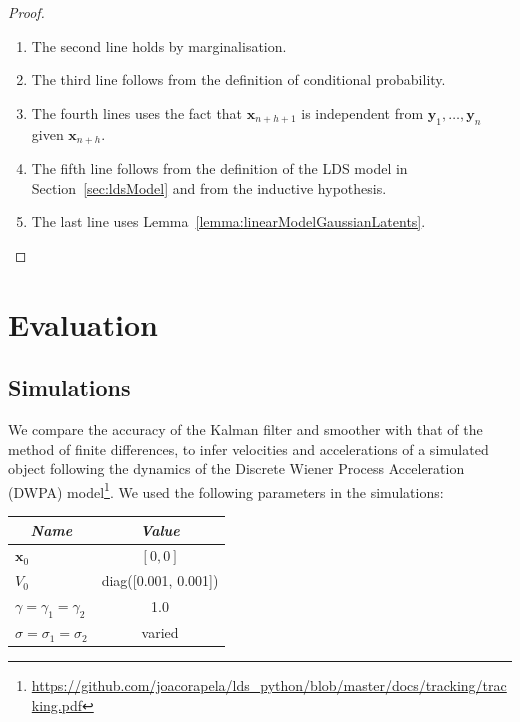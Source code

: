 \documentclass[12pt]{article}
\begin{document}
\begin{proof}
\begin{description}
\begin{enumerate}
                \item The second line holds by marginalisation.

                \item The third line follows from the definition of conditional
                    probability.

                \item The fourth lines uses the fact
                    that $\mathbf{x}_{n+h+1}$ is independent from
                    $\mathbf{y}_1,\ldots,\mathbf{y}_{n}$ given
                    $\mathbf{x}_{n+h}$.

                \item The fifth line follows from the definition of the LDS
                    model in Section~\ref{sec:ldsModel} and from the inductive
                    hypothesis.

                \item The last line uses
                    Lemma~\ref{lemma:linearModelGaussianLatents}.

            \end{enumerate}

    \end{description}

\end{proof}

\section{Evaluation}

\subsection{Simulations}

We compare the accuracy of the Kalman filter and smoother with that of the
method of finite differences, to infer velocities and accelerations of a
simulated object following the dynamics of the Discrete Wiener Process
Acceleration (DWPA)
model\footnote{\url{https://github.com/joacorapela/lds_python/blob/master/docs/tracking/tracking.pdf}}.  We used the following parameters in the
simulations:

\begin{center}
    \begin{tabular}{|l|c|}\hline
        \multicolumn{1}{|c|}{\emph{Name}} & \multicolumn{1}{|c|}{\emph{Value}} \\\hline\hline
        $\mathbf{x}_0$                        & $[0, 0]$\\\hline
        $V_0$                                 & diag([0.001, 0.001])\\\hline
        $\gamma=\gamma_1=\gamma_2$            & 1.0\\\hline
        $\sigma=\sigma_1=\sigma_2$            & varied\\\hline
    \end{tabular}
\end{center}
\end{document}
